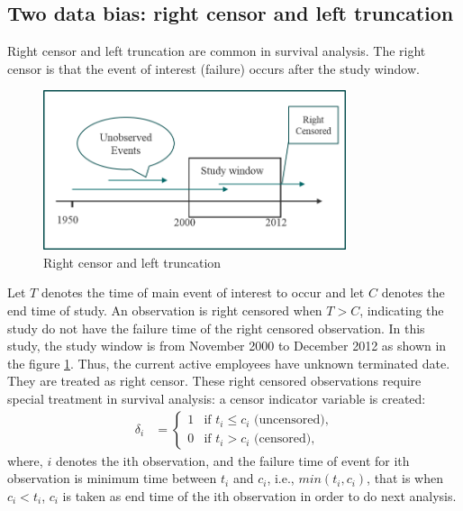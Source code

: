 \documentclass[12pt,letterpaper]{article}
\begin{document}
 \subsection{Two data bias: right censor and left truncation}
 Right censor and left truncation are common in survival analysis. The right censor is that the event of interest (failure) occurs after the study window.
 \begin{figure}[htbp]
 	\centering
 	\includegraphics[width=3.5in]{fig1.png}
 	\caption{Right censor and left truncation}
 	\label{fig:1}
 \end{figure}
  Let $T$ denotes the time of main event of interest to occur and let $C$ denotes the end time of study. An observation is right censored when $T> C$, indicating the study do not have the failure time of the right censored observation. In this study, the study window is from November 2000 to December 2012 as shown in the figure \ref{fig:1}. Thus, the current active employees have unknown terminated date. They are treated as right censor. These right censored observations require special treatment in survival analysis: a censor indicator variable is created:
 \begin{align*}
 	\delta_i&=
 	\begin{cases}
 		1   &\text{if  }  t_i \leq c_i \text{ (uncensored),}\\
 		0   &\text{if  }  t_i > c_i \text{ (censored),}
 	\end{cases}
 \end{align*}
 where, $i$ denotes the ith observation, and the failure time of event for ith observation is minimum time between $t_i$ and $c_i$, i.e., $min(t_i, c_i)$, that is when $ c_i <t_i $, $c_i$ is taken as end time of the ith observation in order to do next  analysis.
\end{document}
